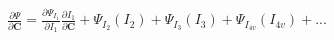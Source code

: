 \documentclass[preview]{standalone}
\begin{document}
\begin{align*}
\frac{\partial \Psi}{\partial \mathbf{C}}  =  \frac{\partial \Psi_{I_1}}{\partial I_1}\frac{\partial I_1}{\partial \mathbf{C}}  +  \Psi_{I_2}(I_2)  +  \Psi_{I_3}(I_3)  +  \Psi_{I_{4v}}(I_{4v})  + ...
\end{align*}
\end{document}
